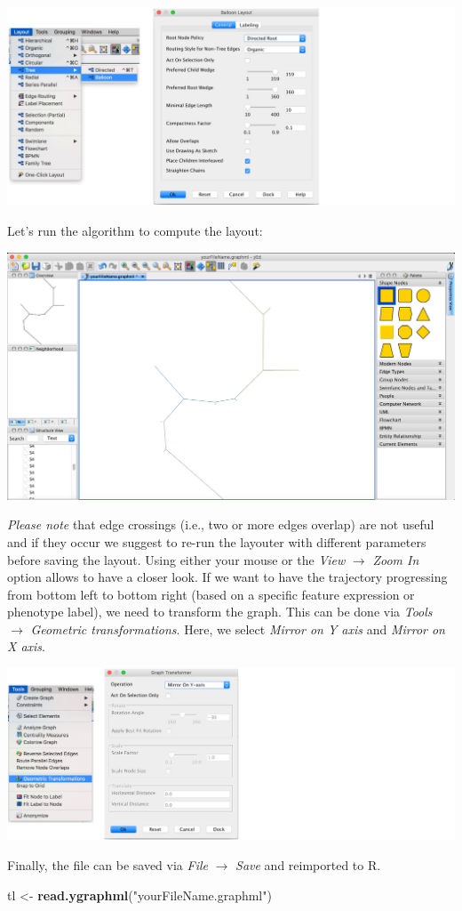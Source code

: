 \documentclass[]{book}
\newenvironment{Shaded}{\begin{snugshade}}{\end{snugshade}}
\newcommand{\KeywordTok}[1]{\textcolor[rgb]{0.13,0.29,0.53}{\textbf{#1}}}
\newcommand{\StringTok}[1]{\textcolor[rgb]{0.31,0.60,0.02}{#1}}
\newcommand{\NormalTok}[1]{#1}
\theoremstyle{definition}
\theoremstyle{definition}
\theoremstyle{definition}
\theoremstyle{remark}
\begin{document}
\includegraphics[width=0.7\linewidth]{img/yEd_2-3}

Let's run the algorithm to compute the layout:

\includegraphics[width=0.7\linewidth]{img/yEd_4}

\emph{Please note} that edge crossings (i.e., two or more edges overlap)
are not useful and if they occur we suggest to re-run the layouter with
different parameters before saving the layout. Using either your mouse
or the \emph{View} \(\rightarrow\) \emph{Zoom In} option allows to have
a closer look. If we want to have the trajectory progressing from bottom
left to bottom right (based on a specific feature expression or
phenotype label), we need to transform the graph. This can be done via
\emph{Tools} \(\rightarrow\) \emph{Geometric transformations}. Here, we
select \emph{Mirror on Y axis} and \emph{Mirror on X axis}.

\includegraphics[width=0.7\linewidth]{img/yEd_5-6}

Finally, the file can be saved via \emph{File} \(\rightarrow\)
\emph{Save} and reimported to R.

\begin{Shaded}
\begin{Highlighting}[]
\NormalTok{tl <-}\StringTok{ }\KeywordTok{read.ygraphml}\NormalTok{(}\StringTok{"yourFileName.graphml"}\NormalTok{)}
\end{Highlighting}
\end{Shaded}
\end{document}
